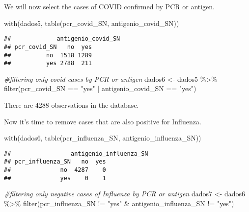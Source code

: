 \documentclass[
]{article}
\newenvironment{Shaded}{\begin{snugshade}}{\end{snugshade}}
\newcommand{\CommentTok}[1]{\textcolor[rgb]{0.56,0.35,0.01}{\textit{#1}}}
\newcommand{\FunctionTok}[1]{\textcolor[rgb]{0.00,0.00,0.00}{#1}}
\newcommand{\NormalTok}[1]{#1}
\newcommand{\OtherTok}[1]{\textcolor[rgb]{0.56,0.35,0.01}{#1}}
\newcommand{\SpecialCharTok}[1]{\textcolor[rgb]{0.00,0.00,0.00}{#1}}
\newcommand{\StringTok}[1]{\textcolor[rgb]{0.31,0.60,0.02}{#1}}
\begin{document}
We will now select the cases of COVID confirmed by PCR or antigen.

\begin{Shaded}
\begin{Highlighting}[]
\FunctionTok{with}\NormalTok{(dados5, }\FunctionTok{table}\NormalTok{(pcr\_covid\_SN, antigenio\_covid\_SN))}
\end{Highlighting}
\end{Shaded}

\begin{verbatim}
##             antigenio_covid_SN
## pcr_covid_SN   no  yes
##          no  1518 1289
##          yes 2788  211
\end{verbatim}

\begin{Shaded}
\begin{Highlighting}[]
\CommentTok{\#filtering only covid cases by PCR or antigen}
\NormalTok{dados6 }\OtherTok{\textless{}{-}}\NormalTok{ dados5 }\SpecialCharTok{\%\textgreater{}\%} 
    \FunctionTok{filter}\NormalTok{(pcr\_covid\_SN }\SpecialCharTok{==} \StringTok{"yes"} \SpecialCharTok{|}\NormalTok{ antigenio\_covid\_SN }\SpecialCharTok{==} \StringTok{"yes"}\NormalTok{)}
\end{Highlighting}
\end{Shaded}

There are 4288 observations in the database.

Now it's time to remove cases that are also positive for Influenza.

\begin{Shaded}
\begin{Highlighting}[]
\FunctionTok{with}\NormalTok{(dados6, }\FunctionTok{table}\NormalTok{(pcr\_influenza\_SN, antigenio\_influenza\_SN))}
\end{Highlighting}
\end{Shaded}

\begin{verbatim}
##                 antigenio_influenza_SN
## pcr_influenza_SN   no  yes
##              no  4287    0
##              yes    0    1
\end{verbatim}

\begin{Shaded}
\begin{Highlighting}[]
\CommentTok{\#filtering only negative cases of Influenza by PCR or antigen}
\NormalTok{dados7 }\OtherTok{\textless{}{-}}\NormalTok{ dados6 }\SpecialCharTok{\%\textgreater{}\%} 
    \FunctionTok{filter}\NormalTok{(pcr\_influenza\_SN }\SpecialCharTok{!=} \StringTok{"yes"} \SpecialCharTok{\&}\NormalTok{ antigenio\_influenza\_SN }\SpecialCharTok{!=} \StringTok{"yes"}\NormalTok{)  }
\end{Highlighting}
\end{Shaded}
\end{document}
